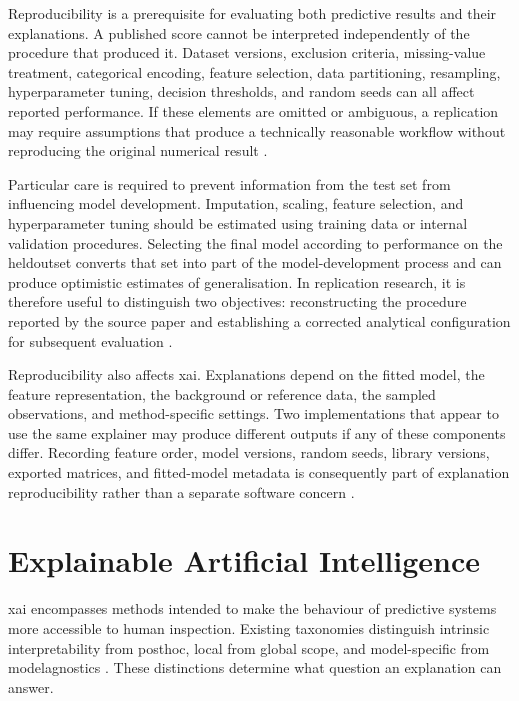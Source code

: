 Reproducibility is a prerequisite for evaluating both predictive results and their explanations. A published score cannot be interpreted independently of the procedure that produced it. Dataset versions, exclusion criteria, missing-value treatment, categorical encoding, feature selection, data partitioning, resampling, hyperparameter tuning, decision thresholds, and random seeds can all affect reported performance. If these elements are omitted or ambiguous, a replication may require assumptions that produce a technically reasonable workflow without reproducing the original numerical result \citep{collins_tripodai_2024, moons_probastai_2025}.

Particular care is required to prevent information from the test set from influencing model development. Imputation, scaling, feature selection, and hyperparameter tuning should be estimated using training data or internal validation procedures. Selecting the final model according to performance on the \gls{heldoutset} converts that set into part of the model-development process and can produce optimistic estimates of generalisation. In replication research, it is therefore useful to distinguish two objectives: reconstructing the procedure reported by the source paper and establishing a corrected analytical configuration for subsequent evaluation \citep{moons_probastai_2025}.

Reproducibility also affects \gls{xai}. Explanations depend on the fitted model, the feature representation, the background or reference data, the sampled observations, and method-specific settings. Two implementations that appear to use the same explainer may produce different outputs if any of these components differ. Recording feature order, model versions, random seeds, library versions, exported matrices, and fitted-model metadata is consequently part of explanation reproducibility rather than a separate software concern \citep{lombardi_explainable_2021}.

\section{Explainable Artificial Intelligence}

\gls{xai} encompasses methods intended to make the behaviour of predictive systems more accessible to human inspection. Existing taxonomies distinguish intrinsic interpretability from \gls{posthoc}, local from global scope, and model-specific from \glspl{modelagnostic} \citep{adadi_peeking_2018, barredo_arrieta_explainable_2020, linardatos_explainable_2020}. These distinctions determine what question an explanation can answer.

